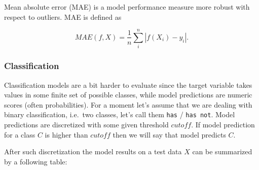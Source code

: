 \documentclass[12pt,]{krantz}
\begin{document}
Mean absolute error (MAE) is a model performance measure more robust with respect to outliers. MAE is defined as

\[
MAE(f, X) = \frac{1}{n} \sum_{i}^{n} |f(X_i) - y_i|.
\]

\hypertarget{classification}{%
\subsubsection{Classification}\label{classification}}

Classification models are a bit harder to evaluate since the target variable takes values in some finite set of possible classes, while model predictions are numeric scores (often probabilities). For a moment let's assume that we are dealing with binary classification, i.e.~two classes, let's call them \texttt{has} / \texttt{has\ not}. Model predictions are discretized with some given threshold \(cutoff\). If model prediction for a class \(C\) is higher than \(cutoff\) then we will say that model predicts \(C\).

After such discretization the model results on a test data \(X\) can be summarized by a following table:
\end{document}
